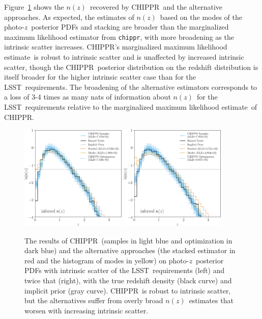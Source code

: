\documentclass[iop]{emulateapj}
\newcommand{\todo}[3]{{\color{#2}\emph{#1}: #3}}
\newcommand{\aim}[1]{\todo{AIM}{red}{#1}}
\newcommand{\Fig}[1]{Figure~\ref{#1}}
\newcommand{\project}[1]{\textsc{#1}}
\newcommand{\lsst}{\project{LSST}}
\newcommand{\Chippr}{\project{CHIPPR}}%
\newcommand{\repo}[1]{\texttt{#1}}
\newcommand{\chippr}{\repo{chippr}}
\newcommand{\pz}{photo-$z$}
\newcommand{\pzpdf}{\pz\ posterior PDF}%
\newcommand{\nz}{$n(z)$}
\newcommand{\mmle}{marginalized maximum likelihood estimate}%
\begin{document}
\Fig{fig:results-scatter} shows the \nz\ recovered by \Chippr\ and the alternative approaches.
As expected, the estimates of \nz\ based on the modes of the \pzpdf s and stacking are broader than the marginalized maximum likelihood estimator from \chippr, with more broadening as the intrinsic scatter increases.
\Chippr's \mmle\ is robust to intrinsic scatter and is unaffected by increased intrinsic scatter, though the \Chippr\ posterior distribution on the redshift distribution is itself broader for the higher intrinsic scatter case than for the \lsst\ requirements.
The broadening of the alternative estimators corresponds to a loss of 3-4 times as many nats of information about \nz\ for the \lsst\ requirements relative to the \mmle\ of \Chippr.

\begin{figure}
	\begin{center}
		\includegraphics[width=0.45\textwidth]{figures/chippr/single_varsigmas_log_estimators.png}
		\includegraphics[width=0.45\textwidth]{figures/chippr/thesis_hivarsig_log_estimators.png}
	\caption{
		The results of \Chippr\ (samples in light blue and optimization in dark blue) and the alternative approaches (the stacked estimator in red and the histogram of modes in yellow) on \pzpdf s with intrinsic scatter of the \lsst\ requirements (left) and twice that (right), with the true redshift density (black curve) and implicit prior (gray curve).
		\Chippr\ is robust to intrinsic scatter, but the alternatives suffer from overly broad \nz\ estimates that worsen with increasing intrinsic scatter.
	}
	\label{fig:results-scatter}
	\end{center}
\end{figure}
\end{document}
